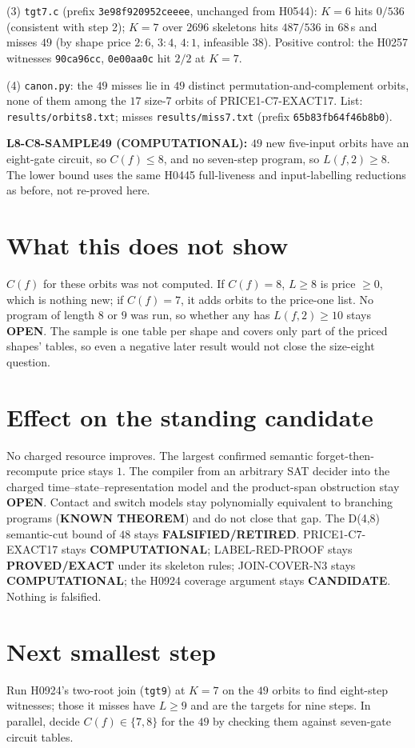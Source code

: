 \documentclass[11pt]{article}
\begin{document}
(3) \texttt{tgt7.c} (prefix \texttt{3e98f920952ceeee}, unchanged from H0544): $K=6$ hits $0/536$ (consistent with step 2); $K=7$ over $2696$ skeletons hits $487/536$ in $68$\,s and misses $49$ (by shape price $2{:}6$, $3{:}4$, $4{:}1$, infeasible $38$). Positive control: the H0257 witnesses \texttt{90ca96cc}, \texttt{0e00aa0c} hit $2/2$ at $K=7$.

(4) \texttt{canon.py}: the $49$ misses lie in $49$ distinct permutation-and-complement orbits, none of them among the $17$ size-7 orbits of PRICE1-C7-EXACT17. List: \texttt{results/orbits8.txt}; misses \texttt{results/miss7.txt} (prefix \texttt{65b83fb64f46b8b0}).

\textbf{L8-C8-SAMPLE49 (COMPUTATIONAL):} $49$ new five-input orbits have an eight-gate circuit, so $C(f)\le8$, and no seven-step program, so $L(f,2)\ge8$. The lower bound uses the same H0445 full-liveness and input-labelling reductions as before, not re-proved here.

\section*{What this does not show}
$C(f)$ for these orbits was not computed. If $C(f)=8$, $L\ge8$ is price $\ge0$, which is nothing new; if $C(f)=7$, it adds orbits to the price-one list. No program of length $8$ or $9$ was run, so whether any has $L(f,2)\ge10$ stays \textbf{OPEN}. The sample is one table per shape and covers only part of the priced shapes' tables, so even a negative later result would not close the size-eight question.

\section*{Effect on the standing candidate}
No charged resource improves. The largest confirmed semantic forget-then-recompute price stays $1$. The compiler from an arbitrary SAT decider into the charged time--state--representation model and the product-span obstruction stay \textbf{OPEN}. Contact and switch models stay polynomially equivalent to branching programs (\textbf{KNOWN THEOREM}) and do not close that gap. The D(4,8) semantic-cut bound of $48$ stays \textbf{FALSIFIED/RETIRED}. PRICE1-C7-EXACT17 stays \textbf{COMPUTATIONAL}; LABEL-RED-PROOF stays \textbf{PROVED/EXACT} under its skeleton rules; JOIN-COVER-N3 stays \textbf{COMPUTATIONAL}; the H0924 coverage argument stays \textbf{CANDIDATE}. Nothing is falsified.

\section*{Next smallest step}
Run H0924's two-root join (\texttt{tgt9}) at $K=7$ on the $49$ orbits to find eight-step witnesses; those it misses have $L\ge9$ and are the targets for nine steps. In parallel, decide $C(f)\in\{7,8\}$ for the $49$ by checking them against seven-gate circuit tables.
\end{document}
